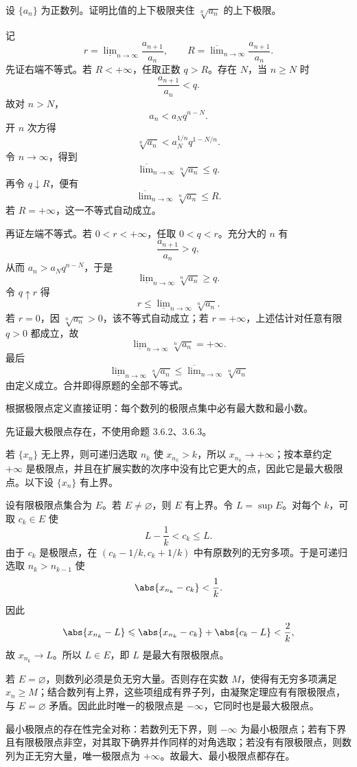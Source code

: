 \begin{xexercise}[3.6.4 练习题 5]
设 $\{a_n\}$ 为正数列。证明比值的上下极限夹住 $\sqrt[n]{a_n}$ 的上下极限。
\end{xexercise}
\begin{xsolution}
记
\[
  r=\underline{\lim}_{n\to\infty}\frac{a_{n+1}}{a_n},
  \qquad
  R=\overline{\lim}_{n\to\infty}\frac{a_{n+1}}{a_n}.
\]
先证右端不等式。若 $R<+\infty$，任取正数 $q>R$。存在 $N$，当 $n\geqslant N$ 时
\[
  \frac{a_{n+1}}{a_n}<q.
\]
故对 $n>N$，
\[
  a_n<a_Nq^{n-N}.
\]
开 $n$ 次方得
\[
  \sqrt[n]{a_n}<a_N^{1/n}q^{1-N/n}.
\]
令 $n\to\infty$，得到
\[
  \overline{\lim}_{n\to\infty}\sqrt[n]{a_n}\leqslant q.
\]
再令 $q\downarrow R$，便有
\[
  \overline{\lim}_{n\to\infty}\sqrt[n]{a_n}\leqslant R.
\]
若 $R=+\infty$，这一不等式自动成立。

再证左端不等式。若 $0<r<+\infty$，任取 $0<q<r$。充分大的 $n$ 有
\[
  \frac{a_{n+1}}{a_n}>q,
\]
从而 $a_n>a_Nq^{n-N}$，于是
\[
  \underline{\lim}_{n\to\infty}\sqrt[n]{a_n}\geqslant q.
\]
令 $q\uparrow r$ 得
\[
  r\leqslant\underline{\lim}_{n\to\infty}\sqrt[n]{a_n}.
\]
若 $r=0$，因 $\sqrt[n]{a_n}>0$，该不等式自动成立；若 $r=+\infty$，上述估计对任意有限 $q>0$ 都成立，故
\[
  \underline{\lim}_{n\to\infty}\sqrt[n]{a_n}=+\infty.
\]
最后
\[
  \underline{\lim}_{n\to\infty}\sqrt[n]{a_n}
  \leqslant
  \overline{\lim}_{n\to\infty}\sqrt[n]{a_n}
\]
由定义成立。合并即得原题的全部不等式。
\end{xsolution}

\begin{xexercise}[3.6.4 练习题 6]
根据极限点定义直接证明：每个数列的极限点集中必有最大数和最小数。
\end{xexercise}
\begin{xsolution}
先证最大极限点存在，不使用命题 3.6.2、3.6.3。

若 $\{x_n\}$ 无上界，则可递归选取 $n_k$ 使 $x_{n_k}>k$，所以 $x_{n_k}\to+\infty$；按本章约定 $+\infty$ 是极限点，并且在扩展实数的次序中没有比它更大的点，因此它是最大极限点。以下设 $\{x_n\}$ 有上界。

设有限极限点集合为 $E$。若 $E\neq\varnothing$，则 $E$ 有上界。令 $L=\sup E$。对每个 $k$，可取 $c_k\in E$ 使
\[
  L-\frac1k<c_k\leqslant L.
\]
由于 $c_k$ 是极限点，在 $(c_k-1/k,c_k+1/k)$ 中有原数列的无穷多项。于是可递归选取 $n_k>n_{k-1}$ 使
\[
  \abs{x_{n_k}-c_k}<\frac1k.
\]
因此
\[
  \abs{x_{n_k}-L}
  \leqslant\abs{x_{n_k}-c_k}+\abs{c_k-L}<\frac2k,
\]
故 $x_{n_k}\to L$。所以 $L\in E$，即 $L$ 是最大有限极限点。

若 $E=\varnothing$，则数列必须是负无穷大量。否则存在实数 $M$，使得有无穷多项满足 $x_n\geqslant M$；结合数列有上界，这些项组成有界子列，由凝聚定理应有有限极限点，与 $E=\varnothing$ 矛盾。因此此时唯一的极限点是 $-\infty$，它同时也是最大极限点。

最小极限点的存在性完全对称：若数列无下界，则 $-\infty$ 为最小极限点；若有下界且有限极限点非空，对其取下确界并作同样的对角选取；若没有有限极限点，则数列为正无穷大量，唯一极限点为 $+\infty$。故最大、最小极限点都存在。
\end{xsolution}

